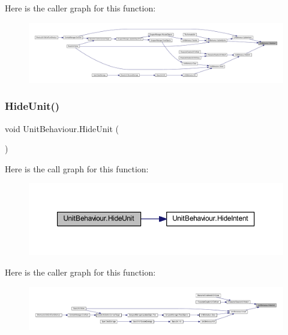 Here is the caller graph for this function\+:\nopagebreak
\begin{figure}[H]
\begin{center}
\leavevmode
\includegraphics[width=350pt]{class_unit_behaviour_a9ba9de594c111333c048b477dd295025_icgraph}
\end{center}
\end{figure}
\mbox{\label{class_unit_behaviour_aaf48af005978a326a61c98905630e469}} 
\subsubsection{\texorpdfstring{HideUnit()}{HideUnit()}}
{\footnotesize\ttfamily void Unit\+Behaviour.\+Hide\+Unit (\begin{DoxyParamCaption}{ }\end{DoxyParamCaption})}

Here is the call graph for this function\+:\nopagebreak
\begin{figure}[H]
\begin{center}
\leavevmode
\includegraphics[width=350pt]{class_unit_behaviour_aaf48af005978a326a61c98905630e469_cgraph}
\end{center}
\end{figure}
Here is the caller graph for this function\+:\nopagebreak
\begin{figure}[H]
\begin{center}
\leavevmode
\includegraphics[width=350pt]{class_unit_behaviour_aaf48af005978a326a61c98905630e469_icgraph}
\end{center}
\end{figure}
\mbox{\label{class_unit_behaviour_a9a32f3234ea6b89f686c6cd55d924348}} 
